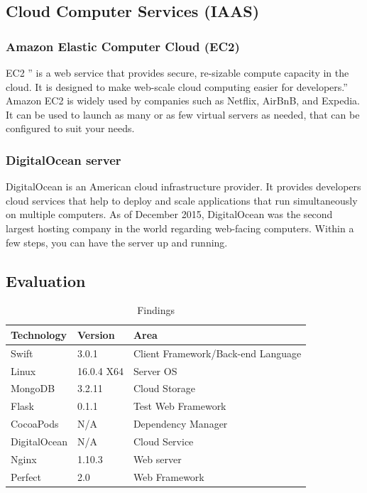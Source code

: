 \subsection{Cloud Computer Services (IAAS)}

\subsubsection{Amazon Elastic Computer Cloud (EC2)}
EC2 ” is a web service that provides secure, re-sizable compute capacity in the cloud. It is designed to make web-scale cloud computing easier for developers.” \cite{ec2} Amazon EC2 is widely used by companies such as Netflix, AirBnB, and Expedia. It can be used to launch as many or as few virtual servers as needed, that can be configured to suit your needs.

\subsubsection{DigitalOcean server}

DigitalOcean \cite{digital} is an American cloud infrastructure provider. It provides developers cloud services that help to deploy and scale applications that run simultaneously on multiple computers. As of December 2015, DigitalOcean was the second largest hosting company in the world regarding web-facing computers. Within a few steps, you can have the server up and running.

\subsection{Evaluation}

\begin{table}[!h]
\centering
\caption{Findings}
\label{my-label}
\begin{tabular}{|l|l|l|}
\hline
\cellcolor{green!20}Technology & \cellcolor{green!20}Version  & \cellcolor{green!20}Area \\ \hline
Swift      & 3.0.1      & Client Framework/Back-end Language \\ \hline
Linux      & 16.0.4 X64 & Server OS                          \\ \hline
MongoDB    & 3.2.11     & Cloud Storage                      \\ \hline
Flask      & 0.1.1      & Test Web Framework                 \\ \hline
CocoaPods  & N/A        & Dependency Manager                 \\ \hline
DigitalOcean    & N/A     & Cloud Service               \\ \hline
Nginx            & 1.10.3       & Web server               \\ \hline
Perfect            & 2.0      & Web Framework               \\ \hline
\end{tabular}
\end{table}

